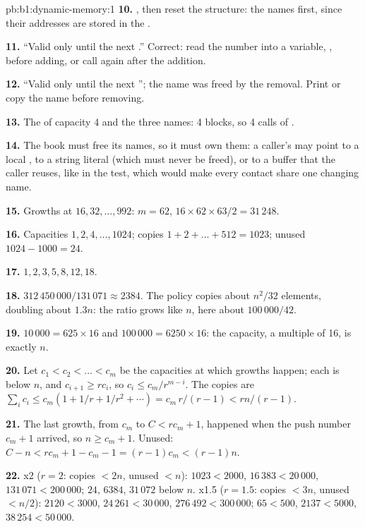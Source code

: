 \begin{solution}{pb:b1:dynamic-memory:1}
\textbf{10.} , then reset the
structure: the names first, since their addresses are stored in the .

\textbf{11.} ``Valid only until the next .'' Correct: read the number into a variable,
, before adding, or call  again after the addition.

\textbf{12.} ``Valid only until the next ''; the name was freed by the removal. Print or copy the name
before removing.

\textbf{13.} The  of capacity 4 and the three names: 4 blocks, so 4 calls of .

\textbf{14.} The book must free its names, so it must own them: a caller's  may point to a local , to a
string literal (which must never be freed), or to a buffer that the caller reuses, like  in the test, which
would make every contact share one changing name.

\textbf{15.} Growths at $16, 32, \dots, 992$: $m = 62$, $16 \times 62 \times 63 / 2 = 31\,248$.

\textbf{16.} Capacities $1, 2, 4, \dots, 1024$; copies $1 + 2 + \dots + 512 = 1023$; unused $1024 - 1000 = 24$.

\textbf{17.} $1, 2, 3, 5, 8, 12, 18$.

\textbf{18.} $312\,450\,000 / 131\,071 \approx 2384$. The policy  copies about $n^2/32$ elements, doubling about
$1.3n$: the ratio grows like $n$, here about $100\,000 / 42$.

\textbf{19.} $10\,000 = 625 \times 16$ and $100\,000 = 6250 \times 16$: the capacity, a multiple of 16, is exactly $n$.

\textbf{20.} Let $c_1 < c_2 < \dots < c_m$ be the capacities at which growths happen; each is below $n$, and
$c_{i+1} \geq r c_i$, so $c_i \leq c_m / r^{m-i}$. The copies are
$\sum_i c_i \leq c_m (1 + 1/r + 1/r^2 + \cdots) = c_m \, r/(r-1) < rn/(r-1)$.

\textbf{21.} The last growth, from $c_m$ to $C < r c_m + 1$, happened when the push number $c_m + 1$ arrived, so
$n \geq c_m + 1$. Unused: $C - n < r c_m + 1 - c_m - 1 = (r-1)c_m < (r-1)n$.

\textbf{22.} x2 ($r = 2$: copies $< 2n$, unused $< n$): $1023 < 2000$, $16\,383 < 20\,000$, $131\,071 < 200\,000$;
$24$, $6384$, $31\,072$ below $n$. x1.5 ($r = 1.5$: copies $< 3n$, unused $< n/2$): $2120 < 3000$, $24\,261 < 30\,000$,
$276\,492 < 300\,000$; $65 < 500$, $2137 < 5000$, $38\,254 < 50\,000$.


\end{solution}
